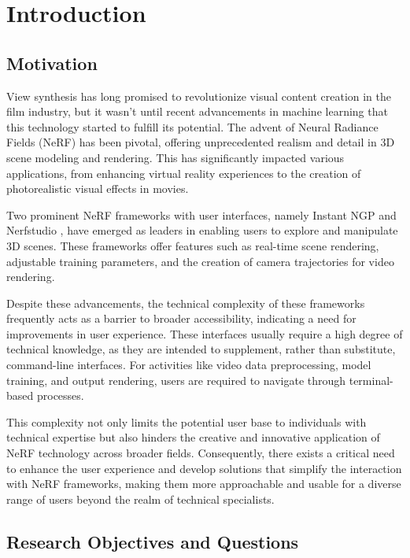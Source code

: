 %
\chapter{Introduction}
\label{sec:intro}

\section{Motivation}
\label{sec:intro:motivation}

View synthesis has long promised to revolutionize visual content creation in the film industry, but it wasn't until recent advancements in machine learning that this technology started to fulfill its potential.
The advent of Neural Radiance Fields (NeRF) has been pivotal, offering unprecedented realism and detail in 3D scene modeling and rendering.
This has significantly impacted various applications, from enhancing virtual reality experiences to the creation of photorealistic visual effects in movies.

Two prominent NeRF frameworks with user interfaces, namely Instant NGP \cite{muller_instant_2022} and Nerfstudio \cite{tancik_nerfstudio_2023}, have emerged as leaders in enabling users to explore and manipulate 3D scenes. 
These frameworks offer features such as real-time scene rendering, adjustable training parameters, and the creation of camera trajectories for video rendering.

Despite these advancements, the technical complexity of these frameworks frequently acts as a barrier to broader accessibility, indicating a need for improvements in user experience. 
These interfaces usually require a high degree of technical knowledge, as they are intended to supplement, rather than substitute, command-line interfaces.
For activities like video data preprocessing, model training, and output rendering, users are required to navigate through terminal-based processes.

This complexity not only limits the potential user base to individuals with technical expertise but also hinders the creative and innovative application of NeRF technology across broader fields. 
Consequently, there exists a critical need to enhance the user experience and develop solutions that simplify the interaction with NeRF frameworks, making them more approachable and usable for a diverse range of users beyond the realm of technical specialists.


\section{Research Objectives and Questions}
\label{sec:intro:objectives_questions}

